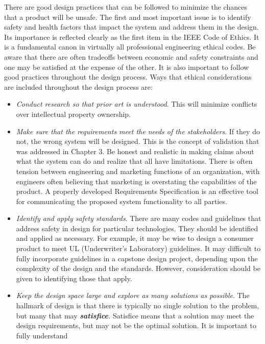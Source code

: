 There are good design practices that can be followed to minimize the
chances that a product will be unsafe. The first and most important
issue is to identify safety and health factors that impact the system
and address them in the design. Its importance is reflected clearly as
the first item in the IEEE Code of Ethics. It is a fundamental canon in
virtually all professional engineering ethical codes. Be aware that
there are often tradeoffs between economic and safety constraints and
one may be satisfied at the expense of the other. It is also important
to follow good practices throughout the design process. Ways that
ethical considerations are included throughout the design process are:

\begin{itemize}
\item
  \emph{Conduct research so that prior art is understood}. This will
  minimize conflicts over intellectual property ownership.
\item
  \emph{Make sure that the requirements meet the needs of the
  stakeholders}. If they do not, the wrong system will be designed. This
  is the concept of validation that was addressed in Chapter 3. Be
  honest and realistic in making claims about what the system can do and
  realize that all have limitations. There is often tension between
  engineering and marketing functions of an organization, with engineers
  often believing that marketing is overstating the capabilities of the
  product. A properly developed Requirements Specification is an
  effective tool for communicating the proposed system functionality to
  all parties.
\item
  \emph{Identify and apply safety standards}. There are many codes and
  guidelines that address safety in design for particular technologies.
  They should be identified and applied as necessary. For example, it
  may be wise to design a consumer product to meet UL (Underwriter's
  Laboratory) guidelines. It may difficult to fully incorporate
  guidelines in a capstone design project, depending upon the complexity
  of the design and the standards. However, consideration should be
  given to identifying those that apply.
\item
  \emph{Keep the design space large and explore as many solutions as
  possible}. The hallmark of design is that there is typically no single
  solution to the problem, but many that may \emph{\textbf{satisfice}.}
  Satisfice means that a solution may meet the design requirements, but
  may not be the optimal solution. It is important to fully understand

\end{itemize}
